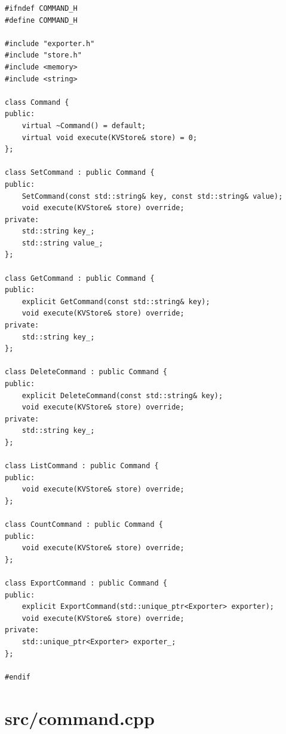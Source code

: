 \documentclass[11pt,a4paper]{book}
\newcommand{\file}[1]{\texttt{#1}}
\begin{document}
\begin{lstlisting}[style=cpp,title={\file{src/command.h}}]
#ifndef COMMAND_H
#define COMMAND_H

#include "exporter.h"
#include "store.h"
#include <memory>
#include <string>

class Command {
public:
    virtual ~Command() = default;
    virtual void execute(KVStore& store) = 0;
};

class SetCommand : public Command {
public:
    SetCommand(const std::string& key, const std::string& value);
    void execute(KVStore& store) override;
private:
    std::string key_;
    std::string value_;
};

class GetCommand : public Command {
public:
    explicit GetCommand(const std::string& key);
    void execute(KVStore& store) override;
private:
    std::string key_;
};

class DeleteCommand : public Command {
public:
    explicit DeleteCommand(const std::string& key);
    void execute(KVStore& store) override;
private:
    std::string key_;
};

class ListCommand : public Command {
public:
    void execute(KVStore& store) override;
};

class CountCommand : public Command {
public:
    void execute(KVStore& store) override;
};

class ExportCommand : public Command {
public:
    explicit ExportCommand(std::unique_ptr<Exporter> exporter);
    void execute(KVStore& store) override;
private:
    std::unique_ptr<Exporter> exporter_;
};

#endif
\end{lstlisting}

\section{src/command.cpp}
\end{document}
